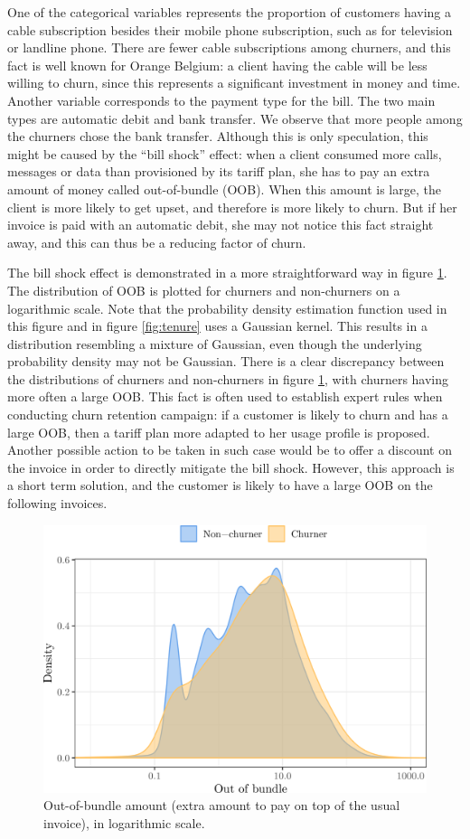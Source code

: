 One of the categorical variables represents the proportion of customers having a
cable subscription besides their mobile phone subscription, such as for
television or landline phone. There are fewer cable subscriptions among churners,
and this fact is well known for Orange Belgium: a client having the cable will
be less willing to churn, since this represents a significant investment in
money and time. Another variable corresponds to the payment type for the bill.
The two main types are automatic debit and bank transfer. We observe that more
people among the churners chose the bank transfer. Although this is only
speculation, this might be caused by the ``bill shock'' effect: when a client
consumed more calls, messages or data than provisioned by its tariff plan, she
has to pay an extra amount of money called out-of-bundle (OOB). When this amount
is large, the client is more likely to get upset, and therefore is more likely
to churn. But if her invoice is paid with an automatic debit, she may not notice
this fact straight away, and this can thus be a reducing factor of churn.

The bill shock effect is demonstrated in a more straightforward way in figure
\ref{fig:oob}. The distribution of OOB is plotted for churners and non-churners
on a logarithmic scale. Note that the probability density estimation function
used in this figure and in figure \ref{fig:tenure} uses a Gaussian kernel. This
results in a distribution resembling a mixture of Gaussian, even though the
underlying probability density may not be Gaussian. There is a clear discrepancy
between the distributions of churners and non-churners in figure \ref{fig:oob},
with churners having more often a large OOB. This fact is often used to
establish expert rules when conducting churn retention campaign: if a customer
is likely to churn and has a large OOB, then a tariff plan more adapted to her
usage profile is proposed. Another possible action to be taken in such case
would be to offer a discount on the invoice in order to directly mitigate the
bill shock. However, this approach is a short term solution, and the customer is
likely to have a large OOB on the following invoices.

\begin{figure}
    \centering
	\includegraphics[width=0.9\linewidth]{figures/oob.png}
	\caption{Out-of-bundle amount (extra amount to pay on top of the usual
	invoice), in logarithmic scale.}
	\label{fig:oob}
\end{figure}


